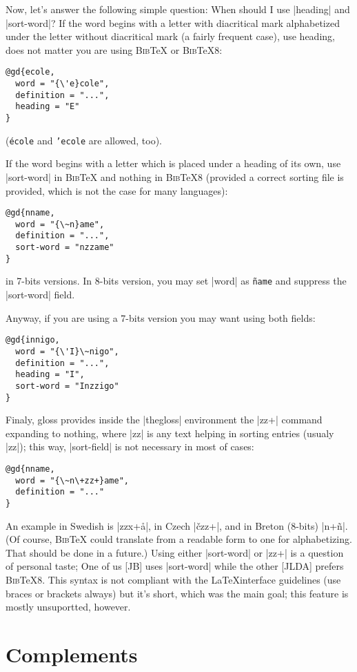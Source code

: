 \documentclass{ltxguide}
\newcommand{\bibTeX}{\textsc{Bib}\TeX}
\begin{document}
Now, let's answer the following simple question: When should I use 
|heading| and |sort-word|?  If the word begins with a letter with 
diacritical mark alphabetized under the letter without diacritical 
mark (a fairly frequent case), use heading, does not matter you are 
using \bibTeX{} or \bibTeX 8:
\begin{verbatim}
@gd{ecole,
  word = "{\'e}cole",
  definition = "...",
  heading = "E"
}
\end{verbatim}
(\texttt{\'ecole} and \texttt{{'e}cole} are allowed, too).

If the word begins with a letter which is placed under a heading of 
its own, use |sort-word| in \bibTeX{} and nothing in \bibTeX8 
(provided a correct sorting file is provided, which is not the case 
for many languages):
\begin{verbatim}
@gd{nname,
  word = "{\~n}ame",
  definition = "...",
  sort-word = "nzzame"
}
\end{verbatim}
in 7-bits versions.  In 8-bits version, you may set |word| as 
\texttt{\~name} and suppress the |sort-word| field.

Anyway, if you are using a 7-bits version you may want using both fields:
\begin{verbatim}
@gd{innigo,
  word = "{\'I}\~nigo",
  definition = "...",
  heading = "I",
  sort-word = "Inzzigo"
}
\end{verbatim}

Finaly, \textsf{gloss} provides inside the |thegloss| environment the 
|\+zz+| command expanding to nothing, where |zz| is any text helping 
in sorting entries (usualy |zz|); this way, |sort-field| is not 
necessary in most of cases:
\begin{verbatim}
@gd{nname,
  word = "{\~n\+zz+}ame",
  definition = "..."
}
\end{verbatim}
An example in Swedish is |\+zzx+\r{a}|, in Czech 
|{\v{c}\+zz+}|, and in Breton (8-bits) |\+n+\~n|.  (Of course, 
\bibTeX{} could translate from a readable form to one for 
alphabetizing.  That should be done in a future.) Using either 
|sort-word| or |\+zz+| is a question of personal taste; One of us [JB] 
uses |sort-word| while the other [JLDA] prefers 
\bibTeX8.  This syntax is not compliant with the \LaTeX interface 
guidelines (use braces or brackets always) but it's short, which was 
the main goal; this feature is mostly unsuportted, however.

\section{Complements}
\end{document}
